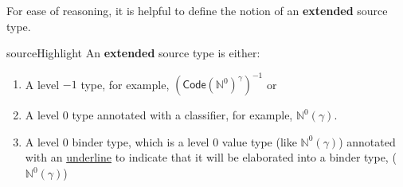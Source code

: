 For ease of reasoning, it is helpful to define the notion of an \textbf{extended} source type.
\begin{definition}{sourceHighlight}\label{dfn:extended-source-type}
An \textbf{extended} source type is either:
  \begin{enumerate}
    \item A level $-1$ type, for example, $(\textsf{Code}(\mathbb{N}^{0})^{\gamma})^{-1}$ or 
    \item A level $0$ type annotated with a classifier, for example, $\mathbb{N}^{0} (\gamma)$. 
    \item A level $0$ binder type, which is a level $0$ value type (like $\mathbb{N}^{0} (\gamma)$) annotated with an \underline{underline} to indicate that it will be elaborated into a binder type, (\underline{$\mathbb{N}^{0} (\gamma)$})
  \end{enumerate}
\end{definition}

